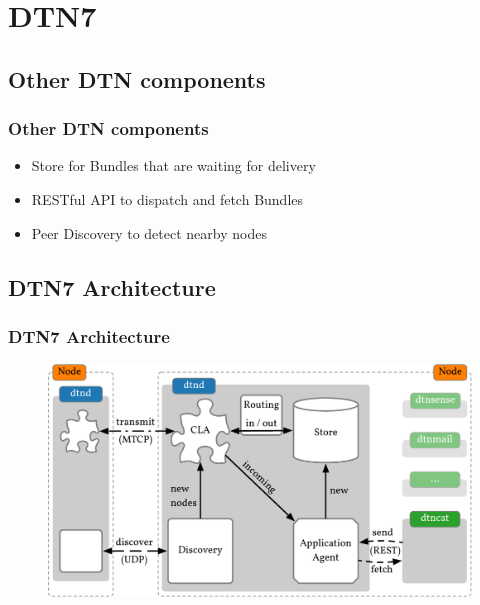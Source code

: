\section{DTN7}

\subsection{Other \acs{DTN} components}

\begin{frame}
  \frametitle{Other \acs{DTN} components}

  \begin{itemize}
  \item Store for Bundles that are waiting for delivery
  \item RESTful API to dispatch and fetch Bundles
  \item Peer Discovery to detect nearby nodes
  \end{itemize}
\end{frame}

\subsection{DTN7 Architecture}

\begin{frame}
  \frametitle{DTN7 Architecture}

  \begin{figure}
    \includegraphics[width=\linewidth,keepaspectratio]{include/dtn7-architecture}
  \end{figure}
\end{frame}
